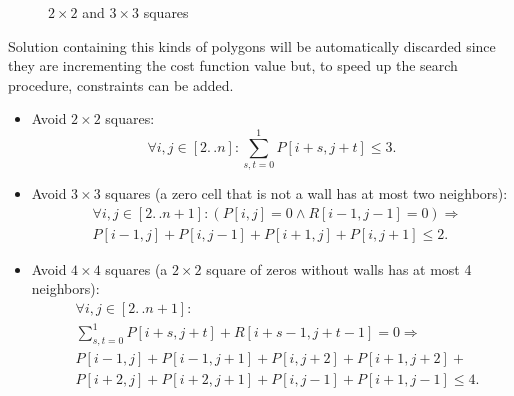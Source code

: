 \documentclass[12pt]{article}
\newcommand*{\itc}{\mathrel{:}} %
\newcommand*{\twodots}{\mathrel{. \, .}}
\begin{document}
\begin{figure}[H]
\begin{minipage}{.5\textwidth}
\begin{center}
    \end{center}
  \end{minipage}
  \caption{$2 \times 2$ and $3 \times 3$ squares}
\end{figure}
Solution containing this kinds of polygons will be automatically discarded since
they are incrementing the cost function value but, to speed up the search
procedure, constraints can be added.
\begin{itemize}
  \item
  Avoid $2 \times 2$ squares:
  \[
    \forall i, j \in [2 \twodots n] \itc \sum_{s, t = 0}^{1} P[i+s,j+t] \leq 3.
  \]
  \item
  Avoid $3 \times 3$ squares (a zero cell that is not a wall has at  most two
  neighbors):
  \begin{align*}
    &\forall i, j \in [2 \twodots n+1] \itc (P[i,j] = 0 \wedge R[i-1,j-1] = 0)
    \Longrightarrow\\
    &P[i-1,j] + P[i,j-1] + P[i+1,j] + P[i,j+1] \leq 2.
  \end{align*}

  \item
  Avoid $4 \times 4$ squares (a $2 \times 2$ square of zeros without walls
  has at most 4 neighbors):
  \begin{align*}
    &\forall i, j \in [2 \twodots n+1] \itc \\
    &\sum_{s, t = 0}^{1} P[i+s,j+t] + R[i+s-1,j+t-1] = 0
    \Longrightarrow \\
    &P[i-1,j] + P[i-1,j+1] + P[i,j+2] + P[i+1,j+2] +\\
    &P[i+2,j] + P[i+2,j+1] + P[i,j-1] + P[i+1,j-1] \leq 4.
  \end{align*}
\end{itemize}
\end{document}
